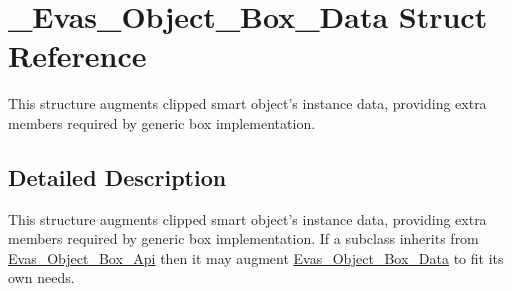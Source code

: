 \section{\_\-Evas\_\-Object\_\-Box\_\-Data Struct Reference}
\label{struct__Evas__Object__Box__Data}


This structure augments clipped smart object's instance data, providing extra members required by generic box implementation.  




\subsection{Detailed Description}
This structure augments clipped smart object's instance data, providing extra members required by generic box implementation. If a subclass inherits from \hyperlink{group__Evas__Object__Box_ga2a8fbeeab4f5ae23e7bc1b291e27c5e1}{Evas\_\-Object\_\-Box\_\-Api} then it may augment \hyperlink{group__Evas__Object__Box_gac9047b7cff95df59f61c7321967caf7b}{Evas\_\-Object\_\-Box\_\-Data} to fit its own needs. 